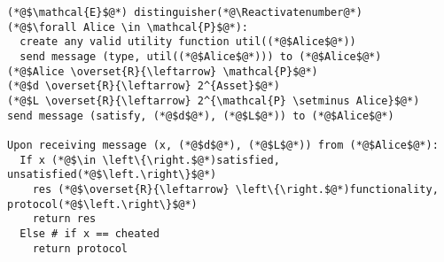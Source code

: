 \Suppressnumber
\begin{lstlisting}[label=distenv, style=numbers]
(*@$\mathcal{E}$@*) distinguisher(*@\Reactivatenumber@*)
(*@$\forall Alice \in \mathcal{P}$@*):
  create any valid utility function util((*@$Alice$@*))
  send message (type, util((*@$Alice$@*))) to (*@$Alice$@*)
(*@$Alice \overset{R}{\leftarrow} \mathcal{P}$@*)
(*@$d \overset{R}{\leftarrow} 2^{Asset}$@*)
(*@$L \overset{R}{\leftarrow} 2^{\mathcal{P} \setminus Alice}$@*)
send message (satisfy, (*@$d$@*), (*@$L$@*)) to (*@$Alice$@*)

Upon receiving message (x, (*@$d$@*), (*@$L$@*)) from (*@$Alice$@*):
  If x (*@$\in \left\{\right.$@*)satisfied, unsatisfied(*@$\left.\right\}$@*)
    res (*@$\overset{R}{\leftarrow} \left\{\right.$@*)functionality, protocol(*@$\left.\right\}$@*)
    return res
  Else # if x == cheated
    return protocol
\end{lstlisting}

